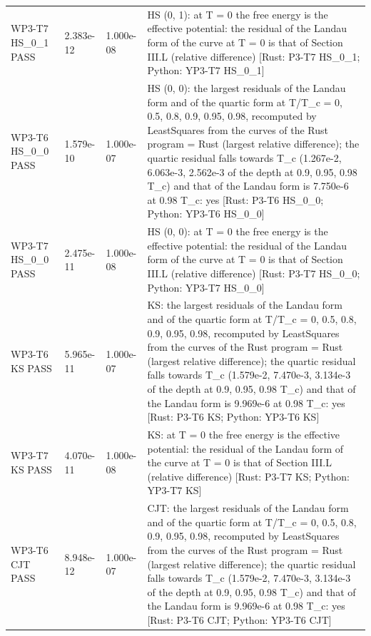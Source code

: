 \documentclass[aps,prd,onecolumn,superscriptaddress,nofootinbib,floatfix,longbibliography]{revtex4-2}
\begin{document}
\begin{longtable}{p{}p{}p{}p{}}
WP3-T7 HS\_0\_1 \newline PASS & 2.383e-12 & 1.000e-08 & HS (0, 1): at T = 0 the free energy is the effective potential: the residual of the Landau form of the curve at T = 0 is that of Section III.L (relative difference) [Rust: P3-T7 HS\_0\_1; Python: YP3-T7 HS\_0\_1] \\
WP3-T6 HS\_0\_0 \newline PASS & 1.579e-10 & 1.000e-07 & HS (0, 0): the largest residuals of the Landau form and of the quartic form at T/T\_c = 0, 0.5, 0.8, 0.9, 0.95, 0.98, recomputed by LeastSquares from the curves of the Rust program = Rust (largest relative difference); the quartic residual falls towards T\_c (1.267e-2, 6.063e-3, 2.562e-3 of the depth at 0.9, 0.95, 0.98 T\_c) and that of the Landau form is 7.750e-6 at 0.98 T\_c: yes [Rust: P3-T6 HS\_0\_0; Python: YP3-T6 HS\_0\_0] \\
WP3-T7 HS\_0\_0 \newline PASS & 2.475e-11 & 1.000e-08 & HS (0, 0): at T = 0 the free energy is the effective potential: the residual of the Landau form of the curve at T = 0 is that of Section III.L (relative difference) [Rust: P3-T7 HS\_0\_0; Python: YP3-T7 HS\_0\_0] \\
WP3-T6 KS \newline PASS & 5.965e-11 & 1.000e-07 & KS: the largest residuals of the Landau form and of the quartic form at T/T\_c = 0, 0.5, 0.8, 0.9, 0.95, 0.98, recomputed by LeastSquares from the curves of the Rust program = Rust (largest relative difference); the quartic residual falls towards T\_c (1.579e-2, 7.470e-3, 3.134e-3 of the depth at 0.9, 0.95, 0.98 T\_c) and that of the Landau form is 9.969e-6 at 0.98 T\_c: yes [Rust: P3-T6 KS; Python: YP3-T6 KS] \\
WP3-T7 KS \newline PASS & 4.070e-11 & 1.000e-08 & KS: at T = 0 the free energy is the effective potential: the residual of the Landau form of the curve at T = 0 is that of Section III.L (relative difference) [Rust: P3-T7 KS; Python: YP3-T7 KS] \\
WP3-T6 CJT \newline PASS & 8.948e-12 & 1.000e-07 & CJT: the largest residuals of the Landau form and of the quartic form at T/T\_c = 0, 0.5, 0.8, 0.9, 0.95, 0.98, recomputed by LeastSquares from the curves of the Rust program = Rust (largest relative difference); the quartic residual falls towards T\_c (1.579e-2, 7.470e-3, 3.134e-3 of the depth at 0.9, 0.95, 0.98 T\_c) and that of the Landau form is 9.969e-6 at 0.98 T\_c: yes [Rust: P3-T6 CJT; Python: YP3-T6 CJT] \\

\end{longtable}
\end{document}
